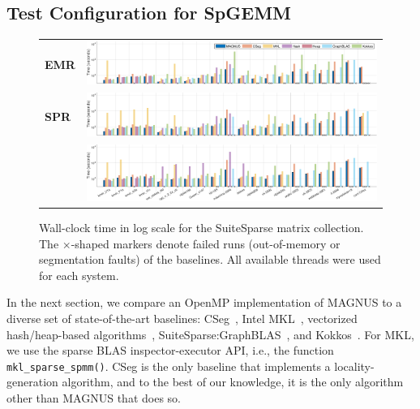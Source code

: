 \subsection{Test Configuration for SpGEMM}
\begin{figure}[!htbp]
\centering
\begin{tabular}{m{0.03\linewidth} m{0.97\linewidth}}
\textbf{EMR} &
\includegraphics[width=0.96\linewidth]{figs/baselines_emr_SuiteSparse_time_bars.pdf} \\
\textbf{SPR} &
\includegraphics[width=0.96\linewidth]{figs/baselines_spr_SuiteSparse_time_bars.pdf} \\
\raisebox{2.5em}{\textbf{SKX}} &
\includegraphics[width=0.96\linewidth]{figs/baselines_skx_SuiteSparse_time_bars.pdf} \\
\end{tabular}
\caption{Wall-clock time in log scale for the SuiteSparse matrix collection.
The $\times$-shaped markers denote failed runs (out-of-memory or segmentation faults) of the baselines.
All available threads were used for each system.}
\label{fig:baselines_suitesparse}
\end{figure}

In the next section, we compare an OpenMP implementation of MAGNUS to a diverse set of state-of-the-art baselines:
CSeg~\cite{cseg}, Intel MKL~\cite{mkl}, vectorized hash/heap-based algorithms~\cite{nagasaka1,nagasaka2}, SuiteSparse:GraphBLAS~\cite{graphblas}, and Kokkos~\cite{kokkos,kokkos2}.
For MKL, we use the sparse BLAS inspector-executor API, i.e., the function \texttt{mkl\_sparse\_spmm()}.
CSeg is the only baseline that implements a locality-generation algorithm, and to the best of our knowledge, it is the only algorithm other than MAGNUS that does so.

